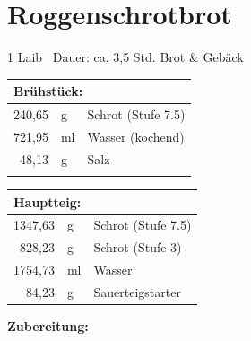 \section{Roggenschrotbrot}
\noindent\textsf{\small 1 Laib \textperiodcentered\ Dauer: ca. 3,5 Std. \hfill Brot \& Gebäck}
\vspace{1em}

\begin{zutatenboxfull}
    \noindent
    \begin{minipage}[t]{0.45\linewidth}
        \begin{tabular}{@{} r l l @{}}
            \multicolumn{3}{l}{\textbf{Brühstück:}} \\
            \midrule
            240,65 & g  & Schrot (Stufe 7.5) \\
            721,95 & ml & Wasser (kochend) \\
            48,13  & g  & Salz \\
            & & %
        \end{tabular}
    \end{minipage}%
    \hfill
    \begin{minipage}[t]{0.45\linewidth}
        \begin{tabular}{@{} r l l @{}}
            \multicolumn{3}{l}{\textbf{Hauptteig:}} \\
            \midrule
            1347,63 & g  & Schrot (Stufe 7.5) \\
            828,23  & g  & Schrot (Stufe 3) \\
            1754,73 & ml & Wasser \\
            84,23   & g  & Sauerteigstarter \\
        \end{tabular}
    \end{minipage}
\end{zutatenboxfull}

\vspace{1.5em}
\noindent\textbf{Zubereitung:}
\vspace{0.5em}

